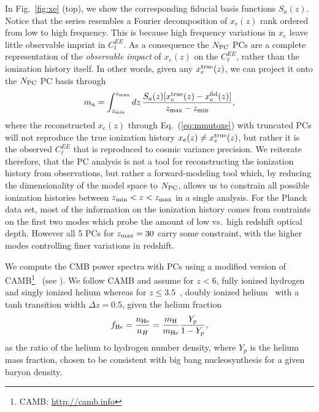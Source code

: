 \documentclass[aps,prd,twocolumn,amsmath,amssymb,showpacs,floatfix,superscriptaddress,nofootinbib]{revtex4-1}
\newcommand{\xef}{x_e^{\rm fid}}
\newcommand{\zmax}{z_{\rm max}}
\newcommand{\zmin}{z_{\rm min}}
\newcommand{\beq}{\begin{equation}}
\newcommand{\eeq}{\end{equation}}
\newcommand{\todo}[1]{\textcolor{darkgreen}{\bf{#1}}}
\begin{document}
 
 
 
 In Fig.~\ref{fig:xe} (top), we show the corresponding fiducial basis functions $S_a(z)$.  
Notice that the series resembles a Fourier decomposition of $x_e(z)$ rank ordered from low to high frequency.
This is because high frequency variations in $x_e$ leave little observable imprint in $C_l^{EE}$.  
As a consequence  the $N_{\rm PC}$ PCs are a complete representation of the \textit{observable impact} of $x_e(z)$ on the $C_\ell^{EE}$, rather than the ionization history itself. In other words, 
given any $x_e^{\rm true}(z)$, we can project it onto the $N_{\rm PC}$ PC basis through
\begin{equation}
m_{a}=
  \int _{\zmin}^{\zmax} dz\, \frac{S_{a}(z) [x_e^{\rm true}(z)-\xef(z)]}{\zmax-\zmin},
\label{eq:xetommu}
\end{equation}
%
where the reconstructed $x_e(z)$ through Eq.~(\ref{eq:mmutoxe}) with truncated PCs will not reproduce the true ionization history $x_e(z) \neq x_e^{\rm true}(z)$, but rather it is the observed $C_\ell^{EE}$ that is reproduced to cosmic variance precision. We reiterate therefore, that the PC analysis is not a tool for reconstructing the ionization history from observations, but rather a forward-modeling tool which, by reducing the dimensionality of the model space to $N_{\rm PC}$, allows us to constrain all possible ionization histories between $z_{\rm min}<z<z_{\rm max}$ in a single analysis.
For the Planck data set, most of the information on the ionization history comes from contraints on the first two modes which probe the amount of low vs.\ high redshift optical depth.   However all 5 PCs for $z_{\rm max}=30$ carry some constraint, with the higher modes controlling finer variations in redshift.

 We  compute the CMB power spectra with PCs using a modified version of CAMB\footnote{CAMB: \url{http://camb.info}}~\cite{Lewis:1999bs, Howlett:2012mh} (see \cite{Heinrich:2016ojb}).
 We follow CAMB and assume for $z<6$, fully ionized hydrogen and singly ionized helium whereas for $z\leq 3.5$~\cite{Becker:2010cu}, doubly ionized helium~\cite{Becker:2010cu} with a tanh transition width $\Delta z = 0.5$, given the helium fraction
 \beq
 f_{\rm He} = \frac{n_{\rm He}}{n_{H}} = \frac{m_{\rm H}}{m_{\rm He}} \frac{Y_p}{1 - Y_p}, 
 \eeq
as the ratio of the helium to hydrogen number density, where $Y_p$ is the helium mass fraction, chosen to be consistent with big bang nucleosynthesis for a given baryon density. 
\end{document}
